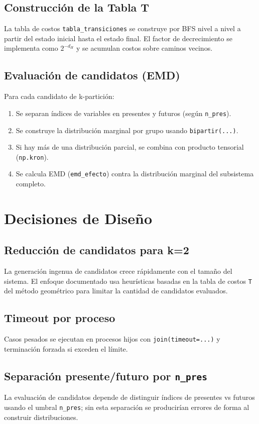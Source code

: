\documentclass[12pt,a4paper]{article}
\begin{document}
\subsection{Construcción de la Tabla T}
La tabla de costos \texttt{tabla\_transiciones} se construye por BFS nivel a nivel a partir del estado inicial hasta el estado final. El factor de decrecimiento se implementa como $2^{-d_H}$ y se acumulan costos sobre caminos vecinos.

\subsection{Evaluación de candidatos (EMD)}
Para cada candidato de k-partición:
\begin{enumerate}
    \item Se separan índices de variables en presentes y futuros (según \texttt{n\_pres}).
    \item Se construye la distribución marginal por grupo usando \texttt{bipartir(...)}.
    \item Si hay más de una distribución parcial, se combina con producto tensorial (\texttt{np.kron}).
    \item Se calcula EMD (\texttt{emd\_efecto}) contra la distribución marginal del subsistema completo.
\end{enumerate}

\section{Decisiones de Diseño}

\subsection{Reducción de candidatos para k=2}
La generación ingenua de candidatos crece rápidamente con el tamaño del sistema. El enfoque documentado usa heurísticas basadas en la tabla de costos \texttt{T} del método geométrico para limitar la cantidad de candidatos evaluados.

\subsection{Timeout por proceso}
Casos pesados se ejecutan en procesos hijos con \texttt{join(timeout=...)} y terminación forzada si exceden el límite.

\subsection{Separación presente/futuro por \texttt{n\_pres}}
La evaluación de candidatos depende de distinguir índices de presentes vs futuros usando el umbral \texttt{n\_pres}; sin esta separación se producirían errores de forma al construir distribuciones.
\end{document}
